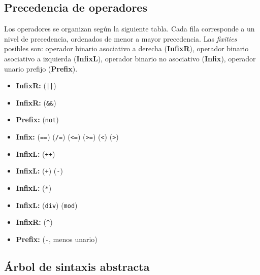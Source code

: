 \documentclass{article}
\begin{document}


\subsection{Precedencia de operadores}

Los operadores se organizan seg\'un la siguiente tabla.
Cada fila corresponde a un nivel de precedencia, ordenados de menor a mayor precedencia.
Las {\em fixities} posibles son:
operador binario asociativo a derecha ({\bf InfixR}),
operador binario asociativo a izquierda ({\bf InfixL}),
operador binario no asociativo ({\bf Infix}),
operador unario prefijo ({\bf Prefix}).

\begin{itemize}
\item {\bf InfixR:}  (\texttt{||})
\item {\bf InfixR:}  (\texttt{\&\&})
\item {\bf Prefix:}  (\texttt{not})
\item {\bf Infix:}
   (\texttt{==})
   (\texttt{/=})
   (\texttt{<=})
   (\texttt{>=})
   (\texttt{<})
   (\texttt{>})
\item {\bf InfixL:}
   (\texttt{++})
\item {\bf InfixL:}
   (\texttt{+})
   (\texttt{-})
\item {\bf InfixL:}
   (\texttt{*})
\item {\bf InfixL:}
   (\texttt{div})
   (\texttt{mod})
\item {\bf InfixR:}
   (\texttt{\^})
\item {\bf Prefix:}
   (\texttt{-}, menos unario)
\end{itemize}

\subsection{\'Arbol de sintaxis abstracta}
\end{document}
